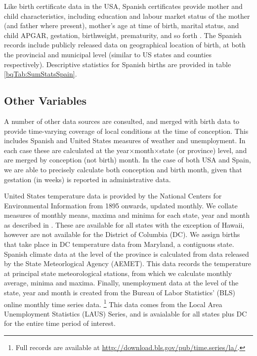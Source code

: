 \documentclass[a4paper, 11 pt]{article}
\theoremstyle{plain}
\begin{document}
\begin{spacing}{1.2}
Like birth certificate data in the USA, Spanish certificates provide mother
and child characteristics, including education and labour market status of the 
mother (and father where present), mother's age at time of birth, marital 
status, and child APGAR, gestation, birthweight, prematurity, and so forth
\citep{INE2013}.  The Spanish records include publicly released data on 
geographical location of birth, at both the provincial and municipal level 
(similar to US states and counties respectively).  Descriptive statistics for
Spanish births are provided in table \ref{bqTab:SumStatsSpain}.

\subsection{Other Variables}
A number of other data sources are consulted, and merged with birth data to
provide time-varying coverage of local conditions at the time of conception.  
This includes Spanish and United States measures of weather and unemployment.  
In each case these are calculated at the year$\times$month$\times$state (or 
province) level, and are merged by conception (not birth) month.  In the
case of both USA and Spain, we are able to precisely calculate both conception
and birth month, given that gestation (in weeks) is reported in administrative
data.

United States temperature data is provided by the National Centers for 
Environmental Information from 1895 onwards, updated monthly.  We collate 
measures of monthly means, maxima and minima for each state, year and month 
as described in \citet{Voseetal2014}.  These are available for all states 
with the exception of Hawaii, however are not available for the District of 
Columbia (DC). We assign births that take place in DC temperature data
from Maryland, a contiguous state.  Spanish climate data at the level of the
province is calculated from data released by the State Meteorlogical Agency 
(AEMET).  This data records the temperature at principal state meteorological
stations, from which we calculate monthly average, minima and maxima.  Finally, 
unemployment data at the level of the state, year and month is created from
the Bureau of Labor Statistics' (BLS) online monthly time series data.%
\footnote{Full records are available at 
\href{http://download.bls.gov/pub/time.series/la/}{http://download.bls.gov/pub/time.series/la/}.} 
This data comes from the Local Area Unemployment Statistics (LAUS) Series,
and is avaialable for all states plus DC for the entire time period of 
interest.


\end{spacing}
\end{document}
